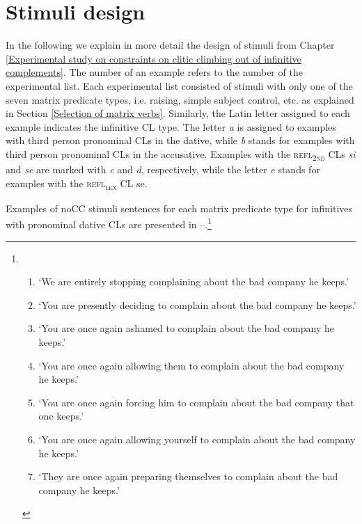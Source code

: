 \chapter{Stimuli design}\label{Appendix}

In the following we explain in more detail the design of stimuli from Chapter \ref{Experimental study on constraints on clitic climbing out of infinitive complements}. The number of an example refers to the number of the experimental list. Each experimental list consisted of stimuli with only one of the seven matrix predicate types, i.e. raising, simple subject control, etc. as explained in Section \ref{Selection of matrix verbs}. Similarly, the Latin letter assigned to each example indicates the infinitive CL type. The letter \textit{a} is assigned to examples with third person pronominal CLs in the dative, while \textit{b} stands for examples with third person pronominal CLs in the accusative. Examples with the \textsc{refl\textsubscript{2nd}} CLs \textit{si} and \textit{se} are marked with \textit{c} and \textit{d}, respectively, while the letter \textit{e} stands for examples with the \textsc{refl\textsubscript{lex}} CL se.\largerpage[-2]

Examples of noCC stimuli sentences for each matrix predicate type for infinitives with pronominal dative CLs are presented in --.\footnote{\vspace{-\baselineskip}%
\begin{enumerate}[label=(A.\arabic*a), ref=A.\arabic*a]
\item\label{A1a}‘We are entirely stopping complaining about the bad company he keeps.’
\item\label{A2a}‘You are presently deciding to complain about the bad company he keeps.’
\item\label{A3a}‘You are once again ashamed to complain about the bad company he keeps.’
\item\label{A4a}‘You are once again allowing them to complain about the bad company he keeps.’
\item\label{A5a}‘You are once again forcing him to complain about the bad company that one keeps.’
\item\label{A6a}‘You are once again allowing yourself to complain about the bad company he keeps.’
\item\label{A7a}‘They are once again preparing themselves to complain about the bad company he keeps.’
 \end{enumerate}}

